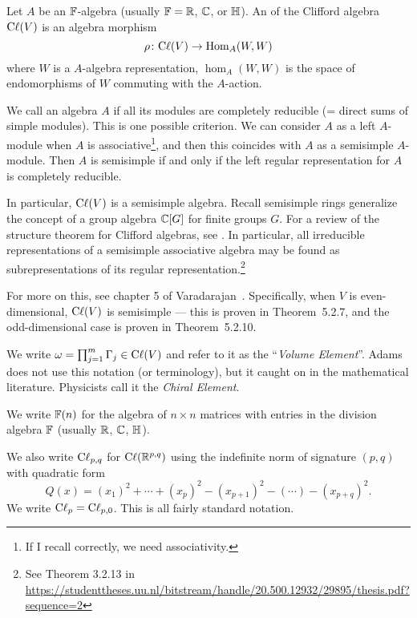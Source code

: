 \begin{definition}
Let $A$ be an $\mathbb{F}$-algebra (usually $\mathbb{F}=\mathbb{R}$, $\mathbb{C}$, or $\mathbb{H}$). An
 of the Clifford algebra $\mathrm{C}\ell(V)$ is an algebra morphism
\[ \rho\colon\mathrm{C}\ell(V)\to\operatorname{Hom}_{A}(W, W) \]
where $W$ is a $A$-algebra representation, $\hom_{A}(W, W)$ is the space
of endomorphisms of $W$ commuting with the $A$-action.
\end{definition}

We call an algebra $A$  if all its modules are
completely reducible (= direct sums of simple modules). This is one
possible criterion. We can consider $A$ as a left $A$-module when $A$ is
associative\footnote{If I recall correctly, we need associativity.}, and
then this coincides with $A$ as a semisimple $A$-module. Then $A$ is
semisimple if and only if the left regular representation for $A$ is
completely reducible.

In particular, $\mathrm{C}\ell(V)$ is a semisimple algebra. Recall semisimple rings
generalize the concept of a group algebra $\mathbb{C}[G]$ for finite groups
$G$. For a review of the structure theorem for Clifford algebras, see
. In particular, all irreducible representations of a
semisimple associative algebra may be found as subrepresentations of its
regular representation.\footnote{See Theorem 3.2.13 in \url{https://studenttheses.uu.nl/bitstream/handle/20.500.12932/29895/thesis.pdf?sequence=2}}

For more on this, see chapter 5 of Varadarajan~\cite{Varadarajan:2004yz}.
Specifically, when $V$ is even-dimensional, $\mathrm{C}\ell(V)$ is semisimple ---
this is proven in Theorem~5.2.7, and the odd-dimensional case is proven
in Theorem~5.2.10.

We write $\omega=\prod^{m}_{j=1}\Gamma_{j}\in\mathrm{C}\ell(V)$ and refer to it as the
``\emph{Volume Element}''. Adams does not use this notation (or
terminology), but it caught on in the mathematical literature.
Physicists call it the \emph{Chiral Element}.

We write $\mathbb{F}(n)$ for the algebra of $n\times n$ matrices with entries
in the division algebra $\mathbb{F}$ (usually $\mathbb{R}$, $\mathbb{C}$, $\mathbb{H}$).

We also write $\mathrm{C}\ell_{p,q}$ for $\mathrm{C}\ell(\mathbb{R}^{p,q})$ using the indefinite norm
of signature $(p,q)$ with quadratic form
\begin{equation}
Q(x) = (x_{1})^{2}+\cdots+(x_{p})^{2}-(x_{p+1})^{2}-(\cdots)-(x_{p+q})^{2}.
\end{equation}
We write $\mathrm{C}\ell_{p}=\mathrm{C}\ell_{p,0}$. This is all fairly standard notation.

